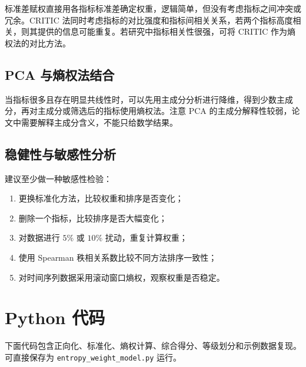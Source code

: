 \documentclass[UTF8,a4paper,12pt]{ctexart}
\begin{document}
标准差赋权直接用各指标标准差确定权重，逻辑简单，但没有考虑指标之间冲突或冗余。CRITIC 法同时考虑指标的对比强度和指标间相关关系，若两个指标高度相关，则其提供的信息可能重复。若研究中指标相关性很强，可将 CRITIC 作为熵权法的对比方法。

\subsection{PCA 与熵权法结合}

当指标很多且存在明显共线性时，可以先用主成分分析进行降维，得到少数主成分，再对主成分或筛选后的指标使用熵权法。注意 PCA 的主成分解释性较弱，论文中需要解释主成分含义，不能只给数学结果。

\subsection{稳健性与敏感性分析}

建议至少做一种敏感性检验：
\begin{enumerate}
  \item 更换标准化方法，比较权重和排序是否变化；
  \item 删除一个指标，比较排序是否大幅变化；
  \item 对数据进行 $5\%$ 或 $10\%$ 扰动，重复计算权重；
  \item 使用 Spearman 秩相关系数比较不同方法排序一致性；
  \item 对时间序列数据采用滚动窗口熵权，观察权重是否稳定。
\end{enumerate}

\section{Python 代码}

下面代码包含正向化、标准化、熵权计算、综合得分、等级划分和示例数据复现。可直接保存为 \texttt{entropy\_weight\_model.py} 运行。
\end{document}
